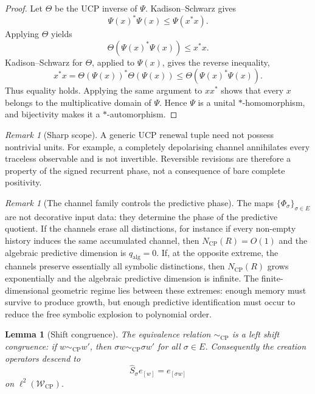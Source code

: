 \documentclass[11pt]{article}
\newtheorem{lemma}[theorem]{Lemma}
\theoremstyle{definition}
\theoremstyle{remark}
\newtheorem{remark}[theorem]{Remark}
\newcommand{\W}{\mathcal{W}}
\newcommand{\CP}{\mathrm{CP}}
\begin{document}
\begin{proof}
Let \(\Theta\) be the UCP inverse of \(\Psi\).  Kadison--Schwarz gives
\[
  \Psi(x)^*\Psi(x)\leq\Psi(x^*x).
\]
Applying \(\Theta\) yields
\[
  \Theta\!\left(\Psi(x)^*\Psi(x)\right)\leq x^*x.
\]
Kadison--Schwarz for \(\Theta\), applied to \(\Psi(x)\), gives the reverse
inequality,
\[
  x^*x
  =\Theta(\Psi(x))^*\Theta(\Psi(x))
  \leq\Theta\!\left(\Psi(x)^*\Psi(x)\right).
\]
Thus equality holds.  Applying the same argument to \(xx^*\) shows that every
\(x\) belongs to the multiplicative domain of \(\Psi\).  Hence \(\Psi\) is a
unital \(*\)-homomorphism, and bijectivity makes it a \(*\)-automorphism.
\end{proof}

\begin{remark}[Sharp scope]
\label{rem:predictive-unit-scope}
A generic UCP renewal tuple need not possess nontrivial units.  For example, a
completely depolarising channel annihilates every traceless observable and is
not invertible.  Reversible revisions are therefore a property of the signed
recurrent phase, not a consequence of bare complete positivity.
\end{remark}

\begin{remark}[The channel family controls the predictive phase]
\label{rem:channel-family-controls-phase}
The maps \(\{\Phi_\sigma\}_{\sigma\in E}\) are not decorative input data: they
determine the phase of the predictive quotient.  If the channels erase all
distinctions, for instance if every non-empty history induces the same
accumulated channel, then \(N_{\CP}(R)=O(1)\) and the algebraic predictive
dimension is \(q_{\mathrm{alg}}=0\).  If, at the opposite extreme, the channels
preserve essentially all symbolic distinctions, then \(N_{\CP}(R)\) grows
exponentially and the algebraic predictive dimension is infinite.  The
finite-dimensional geometric regime lies between these extremes: enough memory
must survive to produce growth, but enough predictive identification must occur
to reduce the free symbolic explosion to polynomial order.
\end{remark}




\begin{lemma}[Shift congruence]
\label{lem:shift-congruence}
The equivalence relation $\sim_{\CP}$ is a left shift congruence: if $w\sim_{\CP}w'$, then $\sigma w\sim_{\CP}\sigma w'$ for all $\sigma\in E$.  Consequently the creation operators descend to
\[
 \widehat S_\sigma e_{[w]}=e_{[\sigma w]}
\]
on $\ell^2(\W_{\CP})$.
\end{lemma}
\end{document}
